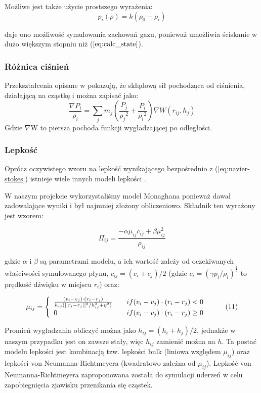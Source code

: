 \documentclass[polish, 12pt]{aghthesis}
\begin{document}
			Możliwe jest także użycie prostszego wyrażenia:	
			\[p_i(\rho) = k(\rho_0 - \rho_i) \tag{9}\]
			
			daje ono możliwość symulowania zachowań gazu, ponieważ umożliwia ściskanie w dużo większym stopniu niż ($\ref{eq:calc_state}$).
			
			\subsubsection{Różnica ciśnień}
			Przekształcenia opisane w \cite{Boryczko} pokazują, że skłądową sił pochodząca od ciśnienia, działającą na cząstkę i można zapisać jako: \[\frac{\nabla P_i}{\rho_i} = \sum_j m_j(\frac{P_j}{{\rho_j}^2} + \frac{P_i}{{\rho_i}^2})\nabla W(r_{ij}, h_j) \label{eq:calc_pressure} \tag{9}\] Gdzie ${\nabla}$W to piersza pochoda funkcji wygładzającej po odległości.
			
			\subsubsection{Lepkość}
			Oprócz oczywistego wzoru na lepkość wynikającego bezpośrednio z (\ref{eq:navier-stokes}) istnieje wiele innych modeli lepkości \cite{Boryczko}.
						
			W naszym projekcie wykorzystaliśmy model Monaghana ponieważ dawał zadowalające wyniki i był najmniej złożony obliczeniowo. Składnik ten wyrażony jest wzorem:
			
			\[{\Pi}_{ij} = \frac{-\alpha \mu_{ij} c_{ij} + \beta\mu_{ij}^2}{\rho_{ij}} \label{eq:viscosity_term} \tag{10}\]
	
			gdzie $\alpha$ i $\beta$ są parametrami modelu, a ich wartość zależy od oczekiwanych właściwości symulowanego płynu, $c_{ij} = (c_i + c_j) / 2$ (gdzie $c_i = (\gamma p_i / \rho_i)^\frac{1}{2}$ to prędkość dźwięku w miejscu $r_i$) oraz:
			
			\[{\mu}_{ij} = \left\{
				\begin{array}{l l}
					\frac{(v_i - v_j)\cdot(r_i - r_j)}{h_{ij}(||r_i - r_j||^2 / h_{ij}^2 + \eta^2)} & \quad if{(v_i - v_j)\cdot(r_i - r_j) < 0}  \\ 0 & \quad if{(v_i - v_j)\cdot(r_i - r_j) \geq 0} 
				\end{array} \right.\ \label{eq:mu_factor} \tag{11}\]
				
			Promień wygładzania obliczyć można jako $h_{ij} = (h_i + h_j)/2$, jednakże w naszym przypadku jest on zawsze stały, więc $h_{ij}$ zamienić można na $h$. Ta postać modelu lepkości jest kombinacją tzw. lepkości bulk (liniowa względem $\mu_{ij}$) oraz lepkości von Neumanna-Richtmeyera (kwadratowo zależna od $\mu_{ij}$). Lepkość von Neumanna-Richtmeyera zaproponowana została do symulacji uderzeń w celu zapobiegnięcia zjawisku przenikania się cząstek. 
			
\end{document}
